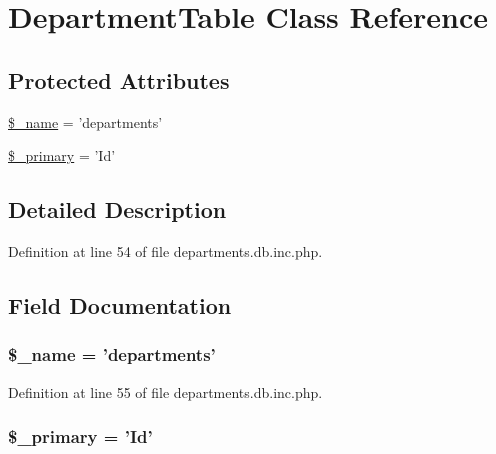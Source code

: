 \hypertarget{class_department_table}{\section{\-Department\-Table \-Class \-Reference}
\label{class_department_table}
}
\subsection*{\-Protected \-Attributes}
\begin{DoxyCompactItemize}
\item 
\hyperlink{class_department_table_a1c89defaf5aa7ac8e526065e8572f580}{\$\-\_\-name} = 'departments'
\item 
\hyperlink{class_department_table_a75191b8d0631b8a5fd6e3405351a22ec}{\$\-\_\-primary} = '\-Id'
\end{DoxyCompactItemize}


\subsection{\-Detailed \-Description}


\-Definition at line 54 of file departments.\-db.\-inc.\-php.



\subsection{\-Field \-Documentation}
\hypertarget{class_department_table_a1c89defaf5aa7ac8e526065e8572f580}{
\subsubsection[{\$\-\_\-name}]{\setlength{\rightskip}{0pt plus 5cm}\$\-\_\-name = 'departments'}}\label{class_department_table_a1c89defaf5aa7ac8e526065e8572f580}


\-Definition at line 55 of file departments.\-db.\-inc.\-php.

\hypertarget{class_department_table_a75191b8d0631b8a5fd6e3405351a22ec}{
\subsubsection[{\$\-\_\-primary}]{\setlength{\rightskip}{0pt plus 5cm}\$\-\_\-primary = '\-Id'}}\label{class_department_table_a75191b8d0631b8a5fd6e3405351a22ec}


